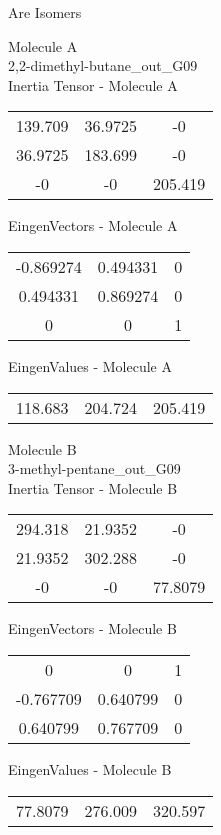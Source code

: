 \begin{center}
\vtab
\vtab
\textcolor{NavyBlue}{\Large Are Isomers}
\end{center}
\newpage
\begin{multicols}{2}
\begin{center}
Molecule A \\ 
2,2-dimethyl-butane\_out\_G09
\\
Inertia Tensor - Molecule A \\
\vtab
\begin{tabular}{|c c c|}
139.709	 & 	36.9725	 & 	-0	 \\
36.9725	 & 	183.699	 & 	-0	 \\
-0	 & 	-0	 & 	205.419
\end{tabular}

\vtab
 EingenVectors - Molecule A     \\
\vtab
\begin{tabular}{|c c c|}
-0.869274	 & 	0.494331	 & 	0	 \\
0.494331	 & 	0.869274	 & 	0	 \\
0	 & 	0	 & 	1
\end{tabular}

\vtab
 EingenValues - Molecule A     \\
\vtab
\begin{tabular}{|c c c|}
118.683	 & 	204.724	 & 	205.419
\end{tabular}
\columnbreak

Molecule B \\ 
3-methyl-pentane\_out\_G09
\\
Inertia Tensor - Molecule B \\
\vtab
\begin{tabular}{|c c c|}
294.318	 & 	21.9352	 & 	-0	 \\
21.9352	 & 	302.288	 & 	-0	 \\
-0	 & 	-0	 & 	77.8079
\end{tabular}

\vtab
 EingenVectors - Molecule B     \\
\vtab
\begin{tabular}{|c c c|}
0	 & 	0	 & 	1	 \\
-0.767709	 & 	0.640799	 & 	0	 \\
0.640799	 & 	0.767709	 & 	0
\end{tabular}

\vtab
 EingenValues - Molecule B     \\
\vtab
\begin{tabular}{|c c c|}
77.8079	 & 	276.009	 & 	320.597
\end{tabular}

\end{center}
\end{multicols}
